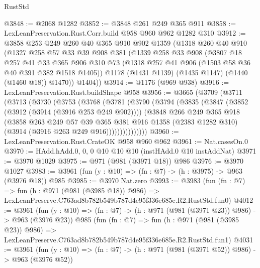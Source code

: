 \begin{lexlean}{RustStd}
\begin{coremodule}
@3848 := @2068 @1282
@3852 := @3848 @261 @249 @365 @911
@3858 := LexLeanPreservation.Rust.Corr.build @958 @960 @962 @1282 @310
@3912 := @3858
    @253
    @249
    @260
    @40
    @365
    @910
    @902
    @1359
    (@1318
      @260
      @40
      @910
      (@1327
        @258
        @57
        @33
        @39
        @908
        @381
        (@1339
          @258
          @33
          @908
          (@3807
            @18
            @257
            @41
            @33
            @365
            @906
            @310
            @73
            (@1318 @257 @41 @906 (@1503 @58 @36 @40 @391 @382 @1518 @1405))
            @1178
            (@1431 @1139)
            (@1435 @1147)
            (@1440 (@1460 @18))
            @1470))
        @1404))
@3914 := @1176 (@969 @938)
@3916 := LexLeanPreservation.Rust.buildShape @958
@3956 := @3665
    (@3709
      (@3711
        (@3713
          (@3730
            (@3753
              (@3768
                (@3781
                  (@3790
                    (@3794
                      (@3835
                        (@3847
                          (@3852 (@3912 (@3914 (@3916 @253 @249 @902))))
                          (@3848
                            @266
                            @249
                            @365
                            @918
                            (@3858
                              @263
                              @249
                              @57
                              @39
                              @365
                              @381
                              @916
                              @1358
                              (@2383 @1282 @310)
                              (@3914 (@3916 @263 @249 @916)))))))))))))))
@3960 := LexLeanPreservation.Rust.CrateOK @958 @960 @962
@3961 := Nat.casesOn.{0}
@3970 := HAdd.hAdd.{0, 0, 0} @10 @10 @10 (instHAdd.{0} @10 instAddNat)
@3971 := @3970 @1029
@3975 := @971 (@981 (@3971 @18)) @986
@3976 := @3970 @1027
@3983 := @3961 (fun (y : @10) => (fn : @7) -> (h : @3975) -> @963 (@3976 @18)) @985
@3985 := @3970 Nat.zero
@3993 := @3983
    (fun (fn : @7) =>
    fun (h : @971 (@981 (@3985 @18)) @986) =>
    LexLeanPreserve.C763ad8b782b549b787d4e95f336e685e.R2.RustStd.fun0)
@4012 := @3961
    (fun (y : @10) => (fn : @7) -> (h : @971 (@981 (@3971 @23)) @986) -> @963 (@3976 @23))
    @985
    (fun (fn : @7) =>
    fun (h : @971 (@981 (@3985 @23)) @986) =>
    LexLeanPreserve.C763ad8b782b549b787d4e95f336e685e.R2.RustStd.fun1)
@4031 := @3961
    (fun (y : @10) => (fn : @7) -> (h : @971 (@981 (@3971 @52)) @986) -> @963 (@3976 @52))

\end{coremodule}
\end{lexlean}
